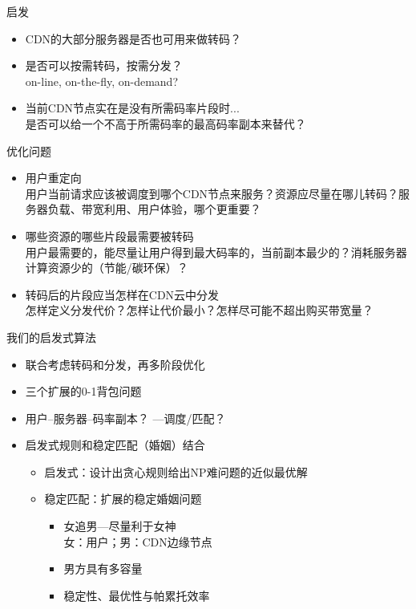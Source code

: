 \documentclass{beamer}
\begin{document}
\begin{frame}{启发}
\begin{itemize}
\item CDN的大部分服务器是否也可用来做转码？\\
\item 是否可以按需转码，按需分发？\\
on-line, on-the-fly, on-demand?
\item 当前CDN节点实在是没有所需码率片段时...\\
是否可以给一个不高于所需码率的最高码率副本来替代？
\end{itemize}
\end{frame}

\begin{frame}{优化问题}
\begin{itemize}
\item 用户重定向\\
用户当前请求应该被调度到哪个CDN节点来服务？资源应尽量在哪儿转码？服务器负载、带宽利用、用户体验，哪个更重要？
\item 哪些资源的哪些片段最需要被转码\\
用户最需要的，能尽量让用户得到最大码率的，当前副本最少的？消耗服务器计算资源少的（节能/碳环保）？
\item 转码后的片段应当怎样在CDN云中分发\\
怎样定义分发代价？怎样让代价最小？怎样尽可能不超出购买带宽量？
\end{itemize}
\end{frame}
\begin{frame}{我们的启发式算法}
\begin{itemize}
\item 联合考虑转码和分发，再多阶段优化
\item 三个扩展的0-1背包问题
\item 用户--服务器--码率副本？ ---调度/匹配？
\item 启发式规则和稳定匹配（婚姻）结合
	\begin{itemize}
		\item 启发式：设计出贪心规则给出NP难问题的近似最优解
		\item 稳定匹配：扩展的稳定婚姻问题\\
			\begin{itemize}
					\item 女追男---尽量利于女神\\
						女：用户；男：CDN边缘节点
					\item 男方具有多容量
					\item 稳定性、最优性与帕累托效率
			\end{itemize}
	\end{itemize}
\end{itemize}
\end{frame}
\end{document}
